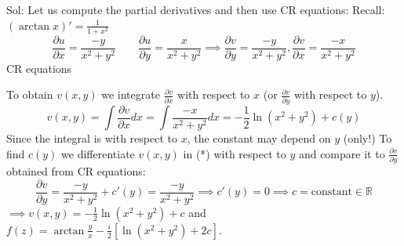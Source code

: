\documentclass{article}
\begin{document}
Sol: Let us compute the partial derivatives and then use CR equations: Recall: $(\arctan x)' = \frac{1}{1 + x^2}$
$$ \frac{\partial u}{\partial x} = \frac{-y}{x^2 + y^2} \qquad \frac{\partial u}{\partial y} = \frac{x}{x^2 + y^2} \implies \frac{\partial v}{\partial y} = \frac{-y}{x^2 + y^2}, \frac{\partial v}{\partial x} = \frac{-x}{x^2 + y^2} $$
CR equations

To obtain $v(x,y)$ we integrate $\frac{\partial v}{\partial x}$ with respect to $x$ (or $\frac{\partial v}{\partial y}$ with respect to $y$).
$$ v(x,y) = \int \frac{\partial v}{\partial x} dx = \int \frac{-x}{x^2 + y^2} dx = -\frac{1}{2} \ln(x^2 + y^2) + c(y) $$
Since the integral is with respect to $x$, the constant may depend on $y$ (only!) To find $c(y)$ we differentiate $v(x,y)$ in (*) with respect to $y$ and compare it to $\frac{\partial v}{\partial y}$ obtained from CR equations:
$$ \frac{\partial v}{\partial y} = \frac{-y}{x^2 + y^2} + c'(y) = \frac{-y}{x^2 + y^2} \implies c'(y) = 0 \implies c = \text{constant} \in \mathbb{R} $$
$\implies v(x,y) = -\frac{1}{2}\ln(x^2 + y^2) + c$ and $f(z) = \arctan \frac{y}{x} - \frac{i}{2}[\ln(x^2 + y^2) + 2c]$.
\end{document}
